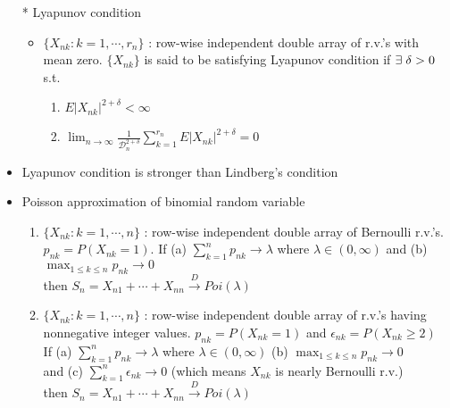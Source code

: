 \documentclass[12pt, A4]{article}
\begin{document}
\begin{itemize}
	\item[*] Lyapunov condition
	\begin{itemize}
		\item $\{X_{nk}:k=1,\cdots, r_n\}$ : row-wise independent double array of r.v.'s with mean zero.
		\newline $\{X_{nk}\}$ is said to be satisfying Lyapunov condition if $\exists \hspace{0.1cm}\delta>0$ s.t.
		\begin{enumerate}
			\item $E|X_{nk}|^{2+\delta}<\infty$
			\item $\lim_{n \to \infty}\frac{1}{\mathcal{D}_n^{2+\delta}}\sum_{k=1}^{r_n}E|X_{nk}|^{2+\delta}=0$
		\end{enumerate}
	\end{itemize}
	\item Lyapunov condition is stronger than Lindberg's condition
	\item Poisson approximation of binomial random variable
	\begin{enumerate}
		\item $\{X_{nk}:k=1,\cdots, n\}$ : row-wise independent double array of Bernoulli r.v.'s. \\ $p_{nk}=P(X_{nk}=1)$. 
		If (a) $\sum_{k=1}^{n}p_{nk}\rightarrow \lambda$ where $\lambda\in(0,\infty)$ and (b) $\max_{1\leq k \leq n} p_{nk}\rightarrow 0$
		\\ then $S_n=X_{n1}+\cdots+X_{nn}\xrightarrow{D}Poi(\lambda)$
		\item  $\{X_{nk}:k=1,\cdots, n\}$ : row-wise independent double array of r.v.'s having nonnegative integer values. \quad $p_{nk}=P(X_{nk}=1)$ and  $\epsilon_{nk}=P(X_{nk}\geq2)$ \\
		If (a) $\sum_{k=1}^{n}p_{nk}\rightarrow \lambda$ where $\lambda\in(0,\infty)$ \quad (b) $\max_{1\leq k \leq n} p_{nk}\rightarrow 0$ \\and (c) $\sum_{k=1}^{n}\epsilon_{nk}\rightarrow 0$ (which means $X_{nk}$ is nearly Bernoulli r.v.)
		\\then $S_n=X_{n1}+\cdots+X_{nn}\xrightarrow{D}Poi(\lambda)$
	\end{enumerate}
\end{itemize}
\end{document}
